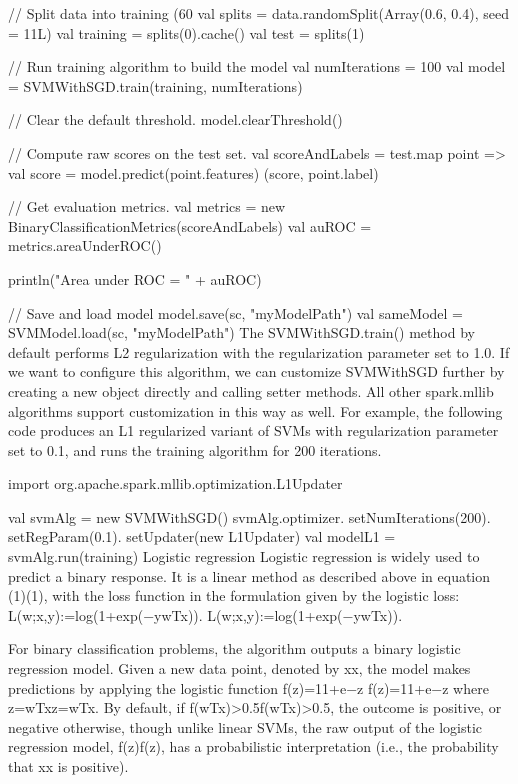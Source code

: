 // Split data into training (60%
val splits = data.randomSplit(Array(0.6, 0.4), seed = 11L)
val training = splits(0).cache()
val test = splits(1)

// Run training algorithm to build the model
val numIterations = 100
val model = SVMWithSGD.train(training, numIterations)

// Clear the default threshold.
model.clearThreshold()

// Compute raw scores on the test set.
val scoreAndLabels = test.map { point =>
  val score = model.predict(point.features)
  (score, point.label)
}

// Get evaluation metrics.
val metrics = new BinaryClassificationMetrics(scoreAndLabels)
val auROC = metrics.areaUnderROC()

println("Area under ROC = " + auROC)

// Save and load model
model.save(sc, "myModelPath")
val sameModel = SVMModel.load(sc, "myModelPath")
The SVMWithSGD.train() method by default performs L2 regularization with the regularization parameter set to 1.0. If we want to configure this algorithm, we can customize SVMWithSGD further by creating a new object directly and calling setter methods. All other spark.mllib algorithms support customization in this way as well. For example, the following code produces an L1 regularized variant of SVMs with regularization parameter set to 0.1, and runs the training algorithm for 200 iterations.

import org.apache.spark.mllib.optimization.L1Updater

val svmAlg = new SVMWithSGD()
svmAlg.optimizer.
  setNumIterations(200).
  setRegParam(0.1).
  setUpdater(new L1Updater)
val modelL1 = svmAlg.run(training)
Logistic regression
Logistic regression is widely used to predict a binary response. It is a linear method as described above in equation (1)(1), with the loss function in the formulation given by the logistic loss:
L(w;x,y):=log(1+exp(−ywTx)).
L(w;x,y):=log⁡(1+exp⁡(−ywTx)).

For binary classification problems, the algorithm outputs a binary logistic regression model. Given a new data point, denoted by xx, the model makes predictions by applying the logistic function
f(z)=11+e−z
f(z)=11+e−z
where z=wTxz=wTx. By default, if f(wTx)>0.5f(wTx)>0.5, the outcome is positive, or negative otherwise, though unlike linear SVMs, the raw output of the logistic regression model, f(z)f(z), has a probabilistic interpretation (i.e., the probability that xx is positive).

